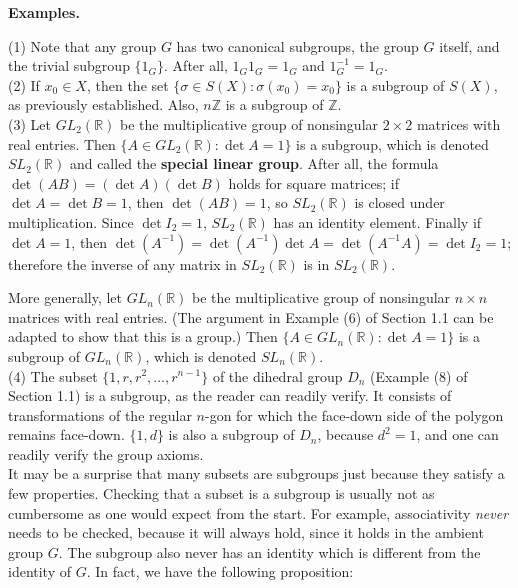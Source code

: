 \documentclass[leqno]{book}
\begin{document}
\noindent\textbf{Examples.}

(1) Note that any group $G$ has two canonical subgroups, the group $G$ itself, and the trivial subgroup $\{1_G\}$.  After all, $1_G1_G=1_G$ and $1_G^{-1}=1_G$.\\

(2) If $x_0\in X$, then the set $\{\sigma\in S(X):\sigma(x_0)=x_0\}$ is a subgroup of $S(X)$, as previously established.  Also, $n\mathbb Z$ is a subgroup of $\mathbb Z$.\\

(3) Let $GL_2(\mathbb R)$ be the multiplicative group of nonsingular $2\times 2$ matrices with real entries.  Then $\{A\in GL_2(\mathbb R):\det A=1\}$ is a subgroup, which is denoted $SL_2(\mathbb R)$ and called the \textbf{special linear group}.  After all, the formula $\det(AB)=(\det A)(\det B)$ holds for square matrices; if $\det A=\det B=1$, then $\det(AB)=1$, so $SL_2(\mathbb R)$ is closed under multiplication.  Since $\det I_2=1$, $SL_2(\mathbb R)$ has an identity element.  Finally if $\det A=1$, then $\det(A^{-1})=\det(A^{-1})\det A=\det(A^{-1}A)=\det I_2=1$; therefore the inverse of any matrix in $SL_2(\mathbb R)$ is in $SL_2(\mathbb R)$.

More generally, let $GL_n(\mathbb R)$ be the multiplicative group of nonsingular $n\times n$ matrices with real entries.  (The argument in Example (6) of Section 1.1 can be adapted to show that this is a group.)  Then $\{A\in GL_n(\mathbb R):\det A=1\}$ is a subgroup of $GL_n(\mathbb R)$, which is denoted $SL_n(\mathbb R)$.\\

(4) The subset $\{1,r,r^2,\dots,r^{n-1}\}$ of the dihedral group $D_n$ (Example (8) of Section 1.1) is a subgroup, as the reader can readily verify.  It consists of transformations of the regular $n$-gon for which the face-down side of the polygon remains face-down.  $\{1,d\}$ is also a subgroup of $D_n$, because $d^2=1$, and one can readily verify the group axioms.\\

\noindent It may be a surprise that many subsets are subgroups just because they satisfy a few properties.  Checking that a subset is a subgroup is usually not as cumbersome as one would expect from the start.  For example, associativity \emph{never} needs to be checked, because it will always hold, since it holds in the ambient group $G$.  The subgroup also never has an identity which is different from the identity of $G$.  In fact, we have the following proposition:\\
\end{document}
